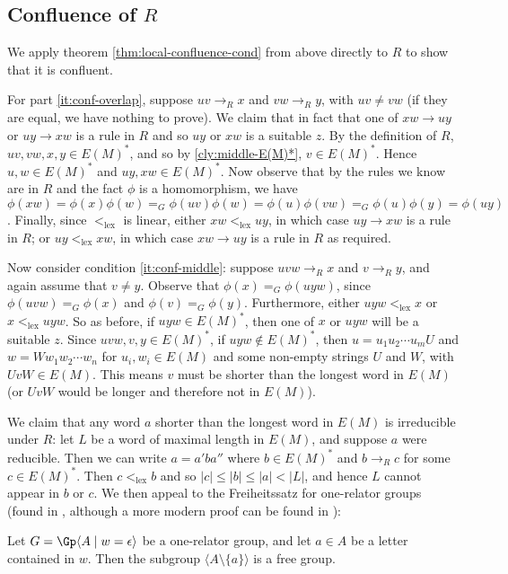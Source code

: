 \documentclass[11pt,libertine,widepage,nosubthm]{lmaths}
\newcommand{\ltlex}{<_{\mathrm{lex}}}
\begin{document}
\subsection{Confluence of $R$}

We apply theorem \ref{thm:local-confluence-cond} from above directly to $R$ to show that it is confluent.

For part \ref{it:conf-overlap}, suppose $uv \to_R x$ and $vw \to_R y$, with $uv \ne vw$ (if they are equal, we have nothing to prove). We claim that in fact that one of $xw \to uy$ or $uy \to xw$ is a rule in $R$ and so $uy$ or $xw$ is a suitable $z$. By the definition of $R$, $uv, vw, x, y\in E(M)^*$, and so by \cref{cly:middle-E(M)*}, $v \in E(M)^*$. Hence $u, w \in E(M)^*$ and $uy, xw \in E(M)^*$. Now observe that by the rules we know are in $R$ and the fact $\phi$ is a homomorphism, we have $\phi(xw) = \phi(x)\phi(w) =_G \phi(uv)\phi(w) = \phi(u)\phi(vw) =_G \phi(u)\phi(y) = \phi(uy)$. Finally, since $\ltlex$ is linear, either $xw \ltlex uy$, in which case $uy \to xw$ is a rule in $R$; or $uy \ltlex xw$, in which case $xw \to uy$ is a rule in $R$ as required.

Now consider condition \ref{it:conf-middle}: suppose $uvw \to_R x$ and $v \to_R y$, and again assume that $v \ne y$. Observe that $\phi(x) =_G \phi(uyw)$, since $\phi(uvw) =_G \phi(x)$ and $\phi(v) =_G \phi(y)$. Furthermore, either $uyw \ltlex x$ or $x \ltlex uyw$. So as before, if $uyw \in E(M)^*$, then one of $x$ or $uyw$ will be a suitable $z$. Since $uvw, v, y \in E(M)^*$, if $uyw \not\in E(M)^*$, then $u = u_1u_2 \cdots u_m U$ and $w = W w_1 w_2 \cdots w_n$ for $u_i, w_i \in E(M)$ and some non-empty strings $U$ and $W$, with $UvW \in E(M)$. This means $v$ must be shorter than the longest word in $E(M)$ (or $UvW$ would be longer and therefore not in $E(M)$).

We claim that any word $a$ shorter than the longest word in $E(M)$ is irreducible under $R$: let $L$ be a word of maximal length in $E(M)$, and suppose $a$ were reducible. Then we can write $a = a'ba''$ where $b \in E(M)^*$ and $b \to_R c$ for some $c \in E(M)^*$. Then $c \ltlex b$ and so $|c| \le |b| \le |a| < |L|$, and hence $L$ cannot appear in $b$ or $c$. We then appeal to the Freiheitssatz for one-relator groups (found in \cite{Magnus2004}, although a more modern proof can be found in \cite{Lyndon2001}):

\begin{theorem}[Freiheitssatz]
	Let $G = \Gp \langle A \mid w = \epsilon \rangle$ be a one-relator group, and let $a \in A$ be a letter contained in $w$. Then the subgroup $\langle A \setminus \{a\} \rangle$ is a free group.
\end{theorem}
\end{document}
